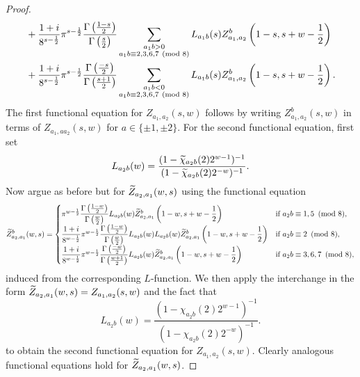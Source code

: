 \documentclass[12pt,reqno,oneside]{amsart}
\begin{document}
\begin{proof}
\begin{align*}
            &+\frac{1+i}{8^{s-\frac{1}{2}}}\pi^{s-\frac{1}{2}}\frac{\Gamma\left(\frac{1-s}{2}\right)}{\Gamma\left(\frac{s}{2}\right)}\sum_{\substack{a_{1}b > 0 \\ a_{1}b \equiv 2,3,6,7 \ \left(\text{mod }8\right)}}L_{a_{1}b}(s)Z_{a_{1},a_{2}}^{b}\left(1-s,s+w-\frac{1}{2}\right) \\
            &+\frac{1+i}{8^{s-\frac{1}{2}}}\pi^{s-\frac{1}{2}}\frac{\Gamma\left(\frac{-s}{2}\right)}{\Gamma\left(\frac{s+1}{2}\right)}\sum_{\substack{a_{1}b < 0 \\ a_{1}b \equiv 2,3,6,7 \ \left(\text{mod }8\right)}}L_{a_{1}b}(s)Z_{a_{1},a_{2}}^{b}\left(1-s,s+w-\frac{1}{2}\right).
        \end{align*}
        The first functional equation for $Z_{a_{1},a_{2}}(s,w)$ follows by writing $Z_{a_{1},a_{2}}^{b}(s,w)$ in terms of $Z_{a_{1},aa_{2}}(s,w)$ for $a \in \{\pm1,\pm2\}$. For the second functional equation, first set
        \[
            L_{a_{2}b}(w) = \frac{(1-\widetilde{\chi}_{a_{2}b}(2)2^{w-1})^{-1}}{(1-\widetilde{\chi}_{a_{2}b}(2)2^{-w})^{-1}}.
        \]
        Now argue as before but for $\widetilde{Z}_{a_{2},a_{1}}(w,s)$ using the functional equation
        \[
            \widetilde{Z}_{a_{2},a_{1}}^{b}(w,s) = \begin{cases} \pi^{w-\frac{1}{2}}\dfrac{\Gamma\left(\frac{1-w}{2}\right)}{\Gamma\left(\frac{w}{2}\right)}L_{a_{2}b}(w)\widetilde{Z}_{a_{2},a_{1}}^{b}\left(1-w,s+w-\dfrac{1}{2}\right) & \text{if $a_{2}b \equiv 1,5 \ \left(\text{mod }8\right)$}, \\ \dfrac{1+i}{8^{w-\frac{1}{2}}}\pi^{w-\frac{1}{2}}\dfrac{\Gamma\left(\frac{1-w}{2}\right)}{\Gamma\left(\frac{w}{2}\right)}L_{a_{2}b}(w)L_{a_{2}b}(w)\widetilde{Z}_{a_{2},a_{1}}^{b}\left(1-w,s+w-\dfrac{1}{2}\right) & \text{if $a_{2}b \equiv 2 \ \left(\text{mod }8\right)$}, \\ \dfrac{1+i}{8^{w-\frac{1}{2}}}\pi^{w-\frac{1}{2}}\dfrac{\Gamma\left(\frac{-w}{2}\right)}{\Gamma\left(\frac{w+1}{2}\right)}L_{a_{2}b}(w)\widetilde{Z}_{a_{2},a_{1}}^{b}\left(1-w,s+w-\dfrac{1}{2}\right) & \text{if $a_{2}b \equiv 3,6,7 \ \left(\text{mod }8\right)$},\end{cases}
        \]
        induced from the corresponding $L$-function. We then apply the interchange in the form $\widetilde{Z}_{a_{2},a_{1}}(w,s) = Z_{a_{1},a_{2}}(s,w)$ and the fact that
        \[
            L_{a_{2}b}(w) = \frac{(1-\chi_{a_{2}b}(2)2^{w-1})^{-1}}{(1-\chi_{a_{2}b}(2)2^{-w})^{-1}}.
        \]
        to obtain the second functional equation for $Z_{a_{1},a_{2}}(s,w)$. Clearly analogous functional equations hold for $\widetilde{Z}_{a_{2},a_{1}}(w,s)$.
    \end{proof}
\end{document}
